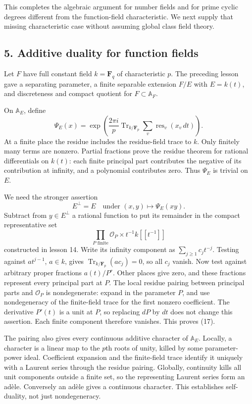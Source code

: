 \documentclass[11pt,a4paper]{article}
\begin{document}
This completes the algebraic argument for number fields and for prime
cyclic degrees different from the function-field characteristic. We next
supply that missing characteristic case without assuming global class
field theory.

\subsection{5. Additive duality for function
fields}\label{additive-duality-for-function-fields}

Let \(F\) have full constant field \(k=\mathbf F_q\) of characteristic
\(p\). The preceding lesson gave a separating parameter, a finite
separable extension \(F/E\) with \(E=k(t)\), and discreteness and
compact quotient for \(F\subset\mathbb A_F\).

On \(\mathbb A_E\), define \[
\Psi_E(x)=
\exp\left(\frac{2\pi i}{p}
\operatorname{Tr}_{k/\mathbf F_p}
\sum_v\operatorname{res}_v(x_v\,dt)\right).
\tag{16}
\] At a finite place the residue includes the residue-field trace to
\(k\). Only finitely many terms are nonzero. Partial fractions prove the
residue theorem for rational differentials on \(k(t)\): each finite
principal part contributes the negative of its contribution at infinity,
and a polynomial contributes zero. Thus \(\Psi_E\) is trivial on \(E\).

We need the stronger assertion \[
E^\perp=E
\quad\text{under }(x,y)\longmapsto\Psi_E(xy).
\tag{17}
\] Subtract from \(y\in E^\perp\) a rational function to put its
remainder in the compact representative set \[
\prod_{P\text{ finite}}\mathcal O_P\times t^{-1}k[[t^{-1}]]
\] constructed in lesson 14. Write its infinity component as
\(\sum_{j\geq1}c_jt^{-j}\). Testing against \(a t^{j-1}\), \(a\in k\),
gives \(\operatorname{Tr}_{k/\mathbf F_p}(a c_j)=0\), so all \(c_j\)
vanish. Now test against arbitrary proper fractions \(a(t)/P^r\). Other
places give zero, and these fractions represent every principal part at
\(P\). The local residue pairing between principal parts and
\(\mathcal O_P\) is nondegenerate: expand in the parameter \(P\), and
use nondegeneracy of the finite-field trace for the first nonzero
coefficient. The derivative \(P'(t)\) is a unit at \(P\), so replacing
\(dP\) by \(dt\) does not change this assertion. Each finite component
therefore vanishes. This proves (17).

The pairing also gives every continuous additive character of
\(\mathbb A_E\). Locally, a character is a linear map to the \(p\)th
roots of unity, killed by some parameter-power ideal. Coefficient
expansion and the finite-field trace identify it uniquely with a Laurent
series through the residue pairing. Globally, continuity kills all unit
components outside a finite set, so the representing Laurent series form
an adèle. Conversely an adèle gives a continuous character. This
establishes self-duality, not just nondegeneracy.
\end{document}
